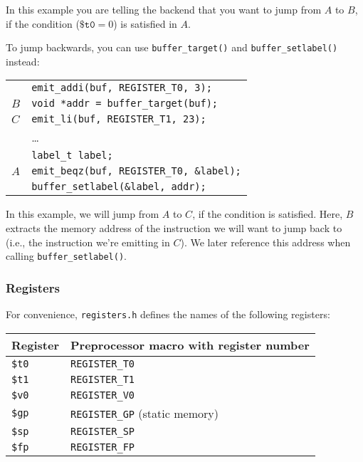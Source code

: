 \documentclass[11pt,a4paper]{article}
\newcommand{\Cty}[1]{\textcolor{dblue}{\texttt{#1}}}
\begin{document}
\vspace{0.5cm}

In this example you are telling the backend that you want to
jump from $A$ to $B$, if the condition ($\texttt{\$t0} = 0$) is satisfied in $A$.

To jump backwards, you can use \texttt{buffer\_target()} and \texttt{buffer\_setlabel()} instead:

\vspace{0.5cm}

\begin{tabular}{ll}
  &\texttt{emit\_addi(buf, REGISTER\_T0, 3);} \\
  $B$&\texttt{\Cty{void *}addr = buffer\_target(buf);} \\
  $C$ &\texttt{emit\_li(buf, REGISTER\_T1, 23);} \\
  & \ldots \\
  &\texttt{\Cty{label\_t} label;}\\
  $A$&\texttt{emit\_beqz(buf, REGISTER\_T0, \&label);}\\
  & \texttt{buffer\_setlabel(\&label, addr);}\\
\end{tabular}

\vspace{0.5cm}

In this example, we will jump from $A$ to $C$, if the condition is satisfied.
Here, $B$ extracts the memory address of the instruction we will want to jump back to (i.e.,
the instruction we're emitting in $C$).  We later reference this address when calling \texttt{buffer\_setlabel()}.


\subsubsection{Registers}

For convenience, \texttt{registers.h} defines the names of the following registers:

\vspace{0.5cm}

\begin{tabular}{|l|l|}
\hline
\textbf{Register} & \textbf{Preprocessor macro with register number} \\
\hline
  \texttt{\$t0} & \texttt{REGISTER\_T0} \\
\hline
  \texttt{\$t1} & \texttt{REGISTER\_T1} \\
\hline
  \texttt{\$v0} & \texttt{REGISTER\_V0} \\
\hline
  \texttt{\$gp} & \texttt{REGISTER\_GP} (static memory) \\
\hline
\texttt{\$sp} & \texttt{REGISTER\_SP}  \\
\hline
\texttt{\$fp} & \texttt{REGISTER\_FP}  \\
\hline
\end{tabular}
\end{document}
